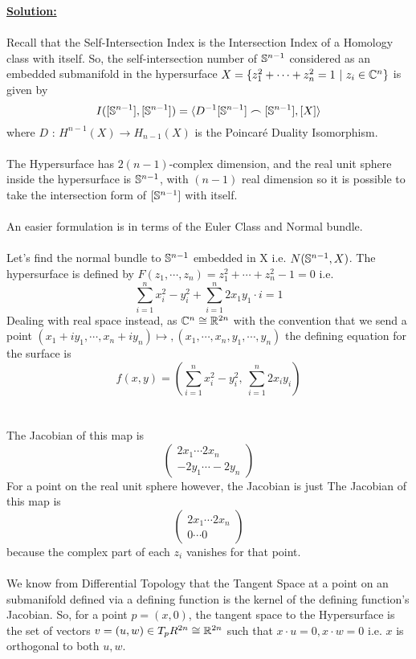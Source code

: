 \documentclass[11pt]{article}
\begin{document}
\vskip 0.5cm
\textbf{\underline{Solution:}}
\\
\\
Recall that the Self-Intersection Index is the Intersection Index of a Homology class with itself. So, the self-intersection number of $\mathbb{S}^{n-1}$ considered as an embedded submanifold in the hypersurface $X = \{ z_1^2 + \cdots + z_n^2 = 1 ~|~ z_i \in \mathbb{C}^n \}$ is given by $$ I( [\mathbb{S}^{n-1}], [\mathbb{S}^{n-1}] ) = \langle D^{-1}[\mathbb{S}^{n-1}] \frown [\mathbb{S}^{n-1}], [X] \rangle $$ where $D \text{ : } H^{n-1}(X) \rightarrow H_{n-1}(X)$ is the Poincar\'e Duality Isomorphism.
\\
\\
The Hypersurface has $2(n-1)$-complex dimension, and the real unit sphere inside the hypersurface is $\mathbb{S}^{n-1}$, with $(n-1)$ real dimension so it is possible to take the intersection form of $[\mathbb{S}^{n-1}]$ with itself.
\\
\\
An easier formulation is in terms of the Euler Class and Normal bundle.
\\
\\
Let's find the normal bundle to $\mathbb{S}^{n-1}$ embedded in X i.e. $N(\mathbb{S}^{n-1}, X)$. The hypersurface is defined by $F(z_1,\cdots,z_n) = z_1^2 + \cdots + z_n^2 - 1 = 0$ i.e. $$ \sum_{i = 1}^{n} x_i^2 - y_i^2 + \sum_{i=1}^n 2x_1y_1 \cdot i = 1 $$ Dealing with real space instead, as $\mathbb{C}^n \cong \mathbb{R}^{2n}$ with the convention that we send a point $(x_1 + iy_1, \cdots, x_n + iy_n) \mapsto , (x_1, \cdots, x_n, y_1, \cdots, y_n)$ the defining equation for the surface is $$ f(x,y) = \left( \sum_{i=1}^n x_i^2 - y_i^2, ~\sum_{i = 1}^{n} 2x_iy_i \right) $$  
\\
\\
The Jacobian of this map is $$ \begin{pmatrix}
  2x_1 \cdots 2x_n \\
  -2y_1 \cdots -2y_n
\end{pmatrix} $$
For a point on the real unit sphere however, the Jacobian is just The Jacobian of this map is $$ \begin{pmatrix}
  2x_1 \cdots 2x_n \\
  0 \cdots 0 
\end{pmatrix} $$ because the complex part of each $z_i$ vanishes for that point. 
\\
\\
We know from Differential Topology that the Tangent Space at a point on an submanifold defined via a defining function is the kernel of the defining function's Jacobian. So, for a point $p = (x,0)$, the tangent space to the Hypersurface is the set of vectors $v = (u,w) \in T_p R^{2n} \cong \mathbb{R}^{2n}$ such that $x \cdot u = 0, x \cdot w = 0$ i.e. $x$ is orthogonal to both $u, w$.
\end{document}
